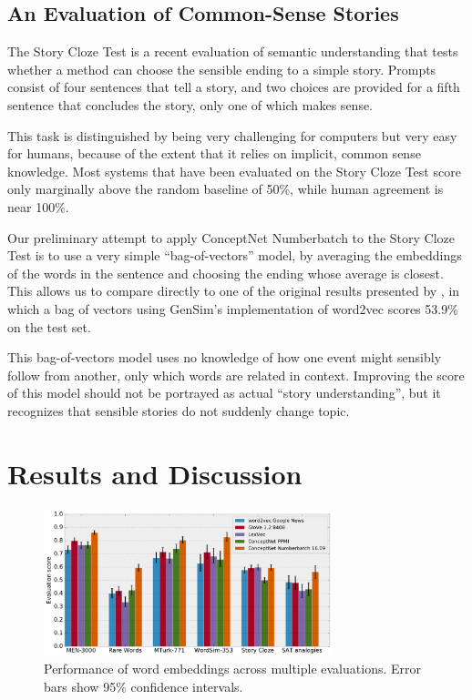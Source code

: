 \documentclass[letterpaper]{article}
\begin{document}
\subsection{An Evaluation of Common-Sense Stories}
\label{story-evaluation}

The Story Cloze Test \cite{mostafazadeh2016cloze} is a recent evaluation of
semantic understanding that tests whether a method can choose the sensible
ending to a simple story. Prompts consist of four sentences that tell a story,
and two choices are provided for a fifth sentence that concludes the story,
only one of which makes sense.

This task is distinguished by being very challenging for computers but very
easy for humans, because of the extent that it relies on implicit, common sense
knowledge. Most systems that have been evaluated on the Story Cloze Test
score only marginally above the random baseline of 50\%, while human
agreement is near 100\%.

Our preliminary attempt to apply ConceptNet Numberbatch to the Story Cloze Test
is to use a very simple ``bag-of-vectors'' model, by averaging the
embeddings of the words in the sentence and choosing the ending whose average is
closest. This allows us to compare directly to one of the original results presented by
\citeauthor{mostafazadeh2016cloze}, in which a bag of vectors using GenSim's
implementation of word2vec scores 53.9\% on the test set.

This bag-of-vectors model uses no knowledge of how one event might sensibly
follow from another, only which words are related in context. Improving the
score of this model should not be portrayed as actual ``story understanding'',
but it recognizes that sensible stories do not suddenly change topic.

\section{Results and Discussion}
\begin{figure}[t]
\centering
\includegraphics[width=3.3in]{eval-graph.pdf}
\caption{
    Performance of word embeddings across multiple evaluations.
    Error bars show 95\% confidence intervals.
}
\label{eval-results}
\end{figure}
\end{document}
